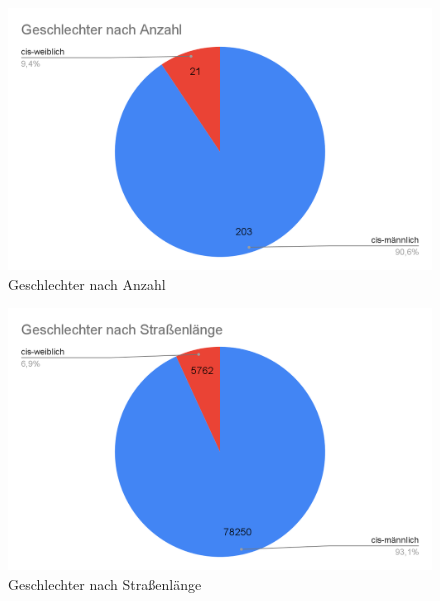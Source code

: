 \documentclass[ngerman,twocolumn,showpacs,%
  nofootinbib,aps,superscriptaddress,%
  eqsecnum,prd,notitlepage,showkeys,10pt,report]{revtex4-2}
\begin{document}
\begin{figure}
\centering
\includegraphics[width=1\linewidth,frame]{3.png}
\caption{Geschlechter nach Anzahl}
\label{fig:GendersByCount}
\end{figure}
\begin{figure}
\centering
\includegraphics[width=1\linewidth,frame]{4.png}
\caption{Geschlechter nach Straßenlänge}
\label{fig:GendersByLength}
\end{figure}
\end{document}
